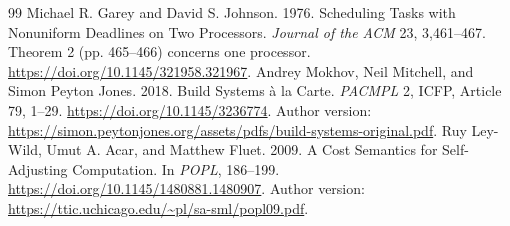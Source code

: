 \documentclass[acmsmall,screen,review,anonymous]{acmart}
\begin{document}
\begin{thebibliography}{99}
 Michael R. Garey and David S. Johnson. 1976. Scheduling Tasks with Nonuniform Deadlines on Two Processors. \emph{Journal of the ACM} 23, 3,461--467. Theorem 2 (pp. 465--466) concerns one processor. \url{https://doi.org/10.1145/321958.321967}.
 Andrey Mokhov, Neil Mitchell, and Simon Peyton Jones. 2018. Build Systems \`a la Carte. \emph{PACMPL} 2, ICFP, Article 79, 1--29. \url{https://doi.org/10.1145/3236774}. Author version: \url{https://simon.peytonjones.org/assets/pdfs/build-systems-original.pdf}.
 Ruy Ley-Wild, Umut A. Acar, and Matthew Fluet. 2009. A Cost Semantics for Self-Adjusting Computation. In \emph{POPL}, 186--199. \url{https://doi.org/10.1145/1480881.1480907}. Author version: \url{https://ttic.uchicago.edu/~pl/sa-sml/popl09.pdf}.


\end{thebibliography}
\end{document}
